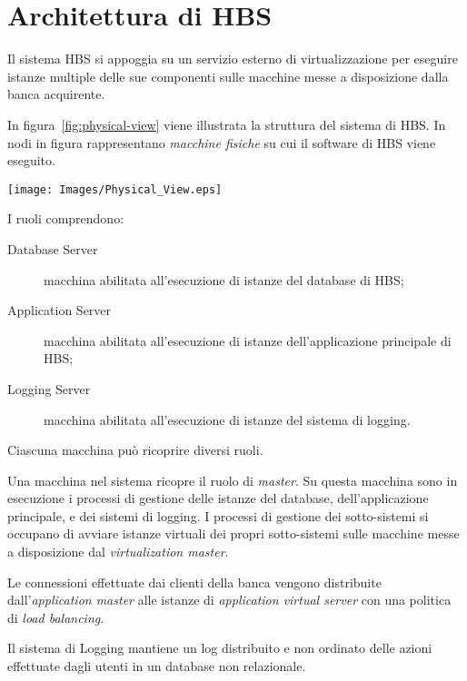
\section{Architettura di HBS}

Il sistema HBS si appoggia su un servizio esterno di virtualizzazione per eseguire istanze multiple delle sue componenti sulle macchine messe a disposizione dalla banca acquirente.

In figura~\ref{fig:physical-view} viene illustrata la struttura del sistema di HBS.
In nodi in figura rappresentano \emph{macchine fisiche} su cui il software di HBS viene eseguito.

\begin{figure*}[h]
	\centering
	\texttt{[image: Images/Physical\_View.eps]}
	\caption{Diagramma di deployment del sistema.}
	\label{fig:physical-view}
\end{figure*}

I ruoli comprendono:
\begin{description}
	\item[Database Server] macchina abilitata all'esecuzione di istanze del database di HBS;

	\item[Application Server] macchina abilitata all'esecuzione di istanze dell'applicazione principale di HBS;

	\item[Logging Server] macchina abilitata all'esecuzione di istanze del sistema di logging.
\end{description}
Ciascuna macchina pu\`o ricoprire diversi ruoli.

Una macchina nel sistema ricopre il ruolo di \emph{master}.
Su questa macchina sono in esecuzione i processi di gestione delle istanze del database, dell'applicazione principale, e dei sistemi di logging.
I processi di gestione dei sotto-sistemi si occupano di avviare istanze virtuali dei propri sotto-sistemi sulle macchine messe a disposizione dal \emph{virtualization master}.

Le connessioni effettuate dai clienti della banca vengono distribuite dall'\emph{application master} alle istanze di \emph{application virtual server} con una politica di \emph{load balancing}.

Il sistema di Logging mantiene un log distribuito e non ordinato delle azioni effettuate dagli utenti in un database non relazionale.


